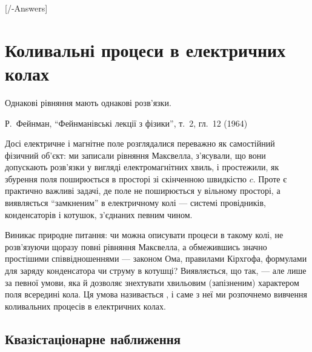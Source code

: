 
[\currfilebase/\currfilebase-Answers]
\chapter{Коливальні процеси в електричних колах}\label{\currfilebase}\hypertarget{EMOscillations}{}
\graphicspath{{\currfilebase/Pictures}}
\epigraph{\Alexander Однакові рівняння мають однакові розв'язки.}{Р.~Фейнман, \enquote{Фейнманівські
лекції з фізики}, т.~2, гл.~12 (1964)}


Досі електричне і магнітне поле розглядалися переважно як самостійний фізичний об'єкт: ми записали рівняння Максвелла, з'ясували, що вони допускають
розв'язки у вигляді електромагнітних хвиль, і простежили, як збурення поля поширюється в просторі зі скінченною швидкістю $c$. Проте є практично важливі задачі, де поле не поширюється у вільному просторі, а виявляється \enquote{замкненим} в електричному колі --- системі провідників,
конденсаторів і котушок, з'єднаних певним чином.

Виникає природне питання: чи можна описувати процеси в такому колі, не розв'язуючи щоразу повні рівняння Максвелла, а обмежившись значно простішими
співвідношеннями --- законом Ома, правилами Кірхгофа, формулами для заряду конденсатора чи струму в котушці? Виявляється, що так, --- але лише за певної
умови, яка й дозволяє знехтувати хвильовим (запізненим) характером поля всередині кола. Ця умова називається , і саме
з неї ми розпочнемо вивчення коливальних процесів в електричних колах.

\section{Квазістаціонарне наближення}\label{sec:quasi-stationary-approximation}\hypertarget{quasi-stationary-approximation}{}

